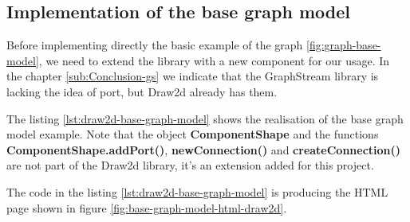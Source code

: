 \subsection{Implementation of the base graph model}
\label{sub:Implementation of the base graph model}

Before implementing directly the basic example of the graph \ref{fig:graph-base-model},
we need to extend the library with a new component for our usage.
In the chapter \ref{sub:Conclusion-gs} we indicate that the GraphStream library
is lacking the idea of port, but Draw2d already has them.

The listing \ref{lst:draw2d-base-graph-model} shows the realisation of the base
graph model example. Note that the object \textbf{ComponentShape} and the
functions \textbf{ComponentShape.addPort()}, \textbf{newConnection()} and
\textbf{createConnection()} are not part of the Draw2d library, it's an
extension added for this project.

The code in the listing \ref{lst:draw2d-base-graph-model} is producing the HTML page shown in
figure \ref{fig:base-graph-model-html-draw2d}.

